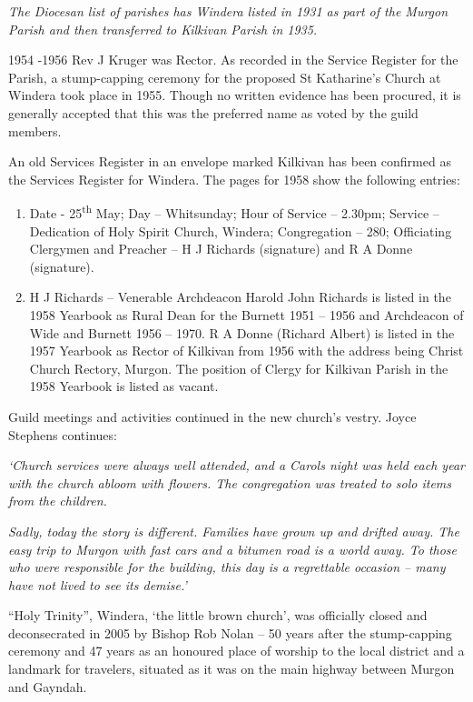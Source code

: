 \emph{The Diocesan list of parishes has Windera listed in 1931 as part of the Murgon Parish and then transferred to Kilkivan Parish in 1935.}

1954 -1956 Rev J Kruger was Rector. As recorded in the Service Register for the Parish, a stump-capping ceremony for the proposed St Katharine's Church at Windera took place in 1955. Though no written evidence has been procured, it is generally accepted that this was the preferred name as voted by the guild members.

An old Services Register in an envelope marked Kilkivan has been confirmed as the Services Register for Windera. The pages for 1958 show the following entries:

\begin{enumerate}
\def\labelenumi{\arabic{enumi}.}
\item
  Date - 25\textsuperscript{th} May; Day -- Whitsunday; Hour of Service -- 2.30pm; Service -- Dedication of Holy Spirit Church, Windera; Congregation -- 280; Officiating Clergymen and Preacher -- H J Richards (signature) and R A Donne (signature).
\item
  H J Richards -- Venerable Archdeacon Harold John Richards is listed in the 1958 Yearbook as Rural Dean for the Burnett 1951 -- 1956 and Archdeacon of Wide and Burnett 1956 -- 1970. R A Donne (Richard Albert) is listed in the 1957 Yearbook as Rector of Kilkivan from 1956 with the address being Christ Church Rectory, Murgon. The position of Clergy for Kilkivan Parish in the 1958 Yearbook is listed as vacant.
\end{enumerate}

Guild meetings and activities continued in the new church's vestry. Joyce Stephens continues:

\emph{`Church services were always well attended, and a Carols night was held each year with the church abloom with flowers. The congregation was treated to solo items from the children.}

\emph{Sadly, today the story is different. Families have grown up and drifted away. The easy trip to Murgon with fast cars and a bitumen road is a world away. To those who were responsible for the building, this day is a regrettable occasion -- many have not lived to see its demise.'}

``Holy Trinity'', Windera, `the little brown church', was officially closed and deconsecrated in 2005 by Bishop Rob Nolan -- 50 years after the stump-capping ceremony and 47 years as an honoured place of worship to the local district and a landmark for travelers, situated as it was on the main highway between Murgon and Gayndah.

